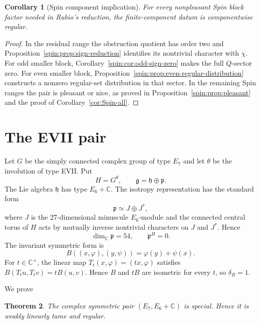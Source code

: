 \documentclass[11pt,reqno]{amsart}
\numberwithin{equation}{section}
\newtheorem{theorem}{Theorem}[section]
\newtheorem{corollary}[theorem]{Corollary}
\theoremstyle{definition}
\theoremstyle{remark}
\newcommand{\C}{\mathbb C}
\newcommand{\fg}{\mathfrak g}
\newcommand{\fh}{\mathfrak h}
\newcommand{\fp}{\mathfrak p}
\begin{document}
\begin{corollary}[Spin component implication]\label{cor:Spin-component}
For every nonpleasant Spin block factor needed in Rubio's reduction, the
finite-component datum is componentwise regular.
\end{corollary}

\begin{proof}
In the residual range the obstruction quotient has order two and
Proposition~\ref{spin:prop:sign-reduction} identifies its nontrivial character
with $\chi$.  For odd smaller block,
Corollary~\ref{spin:cor:odd-sign-zero} makes the full $Q$-sector zero.  For even
smaller block, Proposition~\ref{spin:prop:even-regular-distribution} constructs
a nonzero regular-set distribution in that sector.  In the remaining Spin
ranges the pair is pleasant or nice, as proved in
Proposition~\ref{spin:prop:pleasant} and the proof of
Corollary~\ref{cor:Spin-all}.
\end{proof}

\section{The EVII pair}\label{sec:EVII-family}
Let $G$ be the simply connected complex group of type $E_7$ and let $\theta$
be the involution of type EVII.  Put
\[
 H=G^\theta,
 \qquad
 \fg=\fh\oplus\fp.
\]
The Lie algebra $\fh$ has type $E_6+\C$.  The isotropy representation has the
standard form
\begin{equation}\label{evii:eq:EVII-p}
 \fp\simeq J\oplus J^*,
\end{equation}
where $J$ is the $27$-dimensional minuscule $E_6$-module and the connected
central torus of $H$ acts by mutually inverse nontrivial characters on $J$ and
$J^*$.  Hence
\begin{equation}\label{evii:eq:EVII-dim}
 \dim_{\C}\fp=54,
 \qquad
 \fp^H=0.
\end{equation}
The invariant symmetric form is
\begin{equation}\label{evii:eq:EVII-B}
 B((x,\varphi),(y,\psi))=\varphi(y)+\psi(x).
\end{equation}
For $t\in\C^\times$, the linear map
$T_t(x,\varphi)=(tx,\varphi)$ satisfies
$B(T_tu,T_tv)=tB(u,v)$.  Hence $B$ and $tB$ are isometric for every $t$, so
$\delta_B=1$.

We prove
\begin{theorem}\label{evii:thm:EVII-special}
The complex symmetric pair $(E_7,E_6+\C)$ is special.  Hence it is weakly
linearly tame and regular.
\end{theorem}
\end{document}
